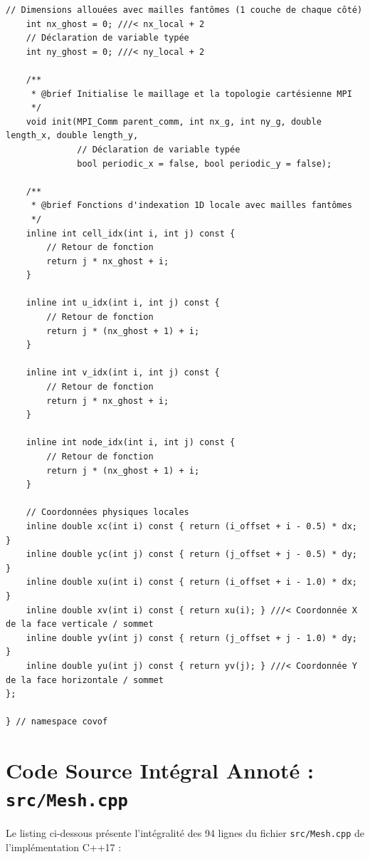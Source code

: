 \documentclass[10pt,a4paper,oneside]{book}
\begin{document}
\begin{lstlisting}[language={[11]C++}]
    // Dimensions allouées avec mailles fantômes (1 couche de chaque côté)
    int nx_ghost = 0; ///< nx_local + 2
    // Déclaration de variable typée
    int ny_ghost = 0; ///< ny_local + 2

    /**
     * @brief Initialise le maillage et la topologie cartésienne MPI
     */
    void init(MPI_Comm parent_comm, int nx_g, int ny_g, double length_x, double length_y,
              // Déclaration de variable typée
              bool periodic_x = false, bool periodic_y = false);

    /**
     * @brief Fonctions d'indexation 1D locale avec mailles fantômes
     */
    inline int cell_idx(int i, int j) const {
        // Retour de fonction
        return j * nx_ghost + i;
    }

    inline int u_idx(int i, int j) const {
        // Retour de fonction
        return j * (nx_ghost + 1) + i;
    }

    inline int v_idx(int i, int j) const {
        // Retour de fonction
        return j * nx_ghost + i;
    }

    inline int node_idx(int i, int j) const {
        // Retour de fonction
        return j * (nx_ghost + 1) + i;
    }

    // Coordonnées physiques locales
    inline double xc(int i) const { return (i_offset + i - 0.5) * dx; }
    inline double yc(int j) const { return (j_offset + j - 0.5) * dy; }
    inline double xu(int i) const { return (i_offset + i - 1.0) * dx; }
    inline double xv(int i) const { return xu(i); } ///< Coordonnée X de la face verticale / sommet
    inline double yv(int j) const { return (j_offset + j - 1.0) * dy; }
    inline double yu(int j) const { return yv(j); } ///< Coordonnée Y de la face horizontale / sommet
};

} // namespace covof

\end{lstlisting}

\section{Code Source Intégral Annoté : \texttt{src/Mesh.cpp}}
Le listing ci-dessous présente l'intégralité des 94 lignes du fichier \texttt{src/Mesh.cpp} de l'implémentation C++17 :
\end{document}
